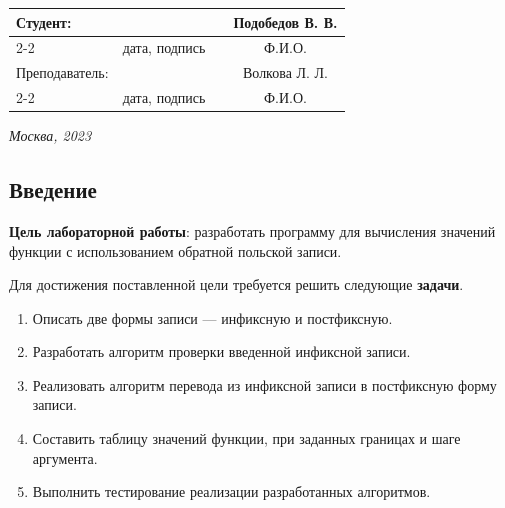 \documentclass[12pt, a4paper]{article}
\begin{document}
\begin{titlepage}
  \fontsize{14}{21}\selectfont
  \vspace{5cm}


  \noindent\begin{tabularx}{\textwidth}{ X >{\centering}p{4cm} p{1cm} c }
   Студент: & & & Подобедов В. В. \\ \cline{2-2} \cline{4-4}
   & \fontsize{10}{15}\selectfont дата, подпись & & \fontsize{10}{15}\selectfont Ф.И.О. \\
   Преподаватель: & & & Волкова Л. Л.\\ \cline{2-2} \cline{4-4}
   & \fontsize{10}{15}\selectfont дата, подпись & & \fontsize{10}{15}\selectfont Ф.И.О.
  \end{tabularx}

  \vspace{\fill}

  \begin{center}
   \it{Москва}, 2023
  \end{center}

  \thispagestyle{empty}
\end{titlepage}

\renewcommand{\contentsname}{Содержание}
\setcounter{page}{2}
\tableofcontents

\newpage
\begin{center}
   \section*{Введение} 
\end{center}

\justifying
\textbf{Цель лабораторной работы}: разработать программу для вычисления значений функции с использованием обратной польской записи.

Для достижения поставленной цели требуется решить следующие \textbf{задачи}.
\begin{enumerate}
\item Описать две формы записи --- инфиксную и постфиксную.
\item Разработать алгоритм проверки введенной инфиксной записи.
\item Реализовать алгоритм перевода из инфиксной записи в постфиксную форму записи.
\item Составить таблицу значений функции, при заданных границах и шаге аргумента.
\item Выполнить тестирование реализации разработанных алгоритмов.
\end{enumerate}
\end{document}
